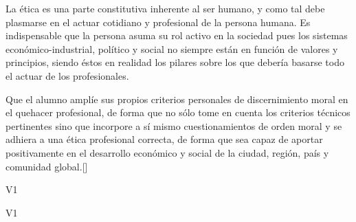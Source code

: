 \begin{syllabus}


\begin{justification}
La ética es una parte constitutiva inherente al ser humano, y como tal debe plasmarse en el actuar cotidiano y profesional de la persona humana. Es indispensable que la persona asuma su rol activo en la sociedad pues los sistemas económico-industrial, político y social no siempre están en función de valores y principios, siendo éstos en realidad los pilares sobre los que debería basarse todo el actuar de los profesionales.
\end{justification}

\begin{goals}
\item Que el alumno amplíe sus propios criterios personales de discernimiento moral en el quehacer profesional, de forma que no sólo tome en cuenta los criterios técnicos pertinentes sino que incorpore a sí­ mismo cuestionamientos de orden moral y se adhiera a una ética profesional correcta, de forma que sea capaz de aportar positivamente en el desarrollo económico y social de la ciudad, región, país y comunidad global.[\Usage]
\end{goals}

\begin{outcomes}{V1}
    \item {}
    \item {}
	\item {}
\end{outcomes}

\begin{competences}{V1}
    \item {}
    \item {}
    \item {}
    \item {}
\end{competences}


\end{syllabus}
